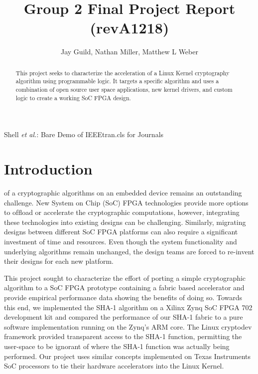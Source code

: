\documentclass[journal]{IEEEtran}
\begin{document}
\title{Group 2 Final Project Report (revA1218)}
\author{Jay Guild, Nathan Miller, Matthew L Weber}

%
{Shell \MakeLowercase{\textit{et al.}}: Bare Demo of IEEEtran.cls for Journals}
% 

\maketitle

\begin{abstract}
This project seeks to characterize the acceleration of a Linux Kernel cryptography algorithm using programmable logic. It targets a specific algorithm and uses a combination of open source user space applications, new kernel drivers, and custom logic to create a working SoC FPGA design.
\end{abstract}


\IEEEpeerreviewmaketitle

\section{Introduction}
 of a cryptographic algorithms on an embedded device remains an outstanding challenge. New System on Chip (SoC) FPGA technologies provide more options to ofﬂoad or accelerate the cryptographic computations, however, integrating these technologies into existing designs can be challenging. Similarly, migrating designs between different SoC FPGA platforms can also require a signiﬁcant investment of time and resources. Even though the system functionality and underlying algorithms remain unchanged, the design teams are forced to re-invent their designs for each new platform.

This project sought to characterize the effort of porting a simple cryptographic algorithm to a SoC FPGA prototype containing a fabric based accelerator and provide empirical performance data showing the beneﬁts of doing so. Towards this end, we implemented the SHA-1 algorithm on a Xilinx Zynq SoC FPGA 702 development kit and compared the performance of our SHA-1 fabric to a pure software implementation running on the Zynq’s ARM core.  The Linux cryptodev framework provided transparent access to the SHA-1 function, permitting the user-space to be ignorant of where the SHA-1 function was actually being performed.   Our project uses similar concepts implemented on Texas Instruments SoC processors to tie their hardware accelerators into the Linux Kernel.
\end{document}
